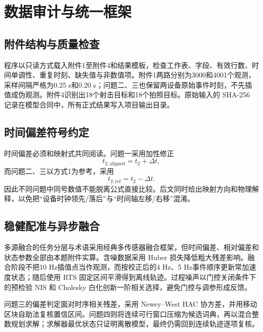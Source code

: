 \section{数据审计与统一框架}

\subsection{附件结构与质量检查}

程序以只读方式载入附件1至附件4和结果模板，检查工作表、字段、有效行数、时间单调性、重复时刻、缺失值与非数值项。附件1两路分别为3000和4001个观测，采样间隔严格为0.25 s和0.20 s；问题二、三也保留两设备原始事件时刻，不先插值成伪观测。附件4识别出18个射击目标和18个拍照目标。原始输入的 SHA-256 记录在模型合同中，所有正式结果写入项目输出目录。

\subsection{时间偏差符号约定}

时间偏差必须和映射式共同阅读。问题一采用加性修正
\begin{equation}
  t_{2,\mathrm{aligned}}=t_2+\Delta t,
  \label{eq:common-q1-time}
\end{equation}
而问题二、三以方式1为参考，采用
\begin{equation}
  t_{2,\mathrm{ref}}=t_2-\Delta t.
  \label{eq:common-q23-time}
\end{equation}
因此不同问题中同号数值不能脱离公式直接比较。后文同时给出映射方向和物理解释，以免把“设备时钟领先/落后”与“时间轴左移/右移”混淆。

\subsection{稳健配准与异步融合}

多源融合的任务分层与术语采用经典多传感器融合框架\cite{hall1997}，但时间偏差、相对偏差和状态参数全部由本题附件实算。含噪数据采用 Huber 损失降低粗大残差影响\cite{huber1964}。融合阶段不把10 Hz插值点当作观测，而按校正后的4 Hz、5 Hz事件顺序更新常加速度状态；随后使用 RTS 固定区间平滑得到离线轨迹\cite{kalman1960,rts1965}。过程噪声以门控关闭条件下的预检验 NIS 和 Cholesky 白化创新一阶相关选择，避免门控与调参形成反馈。

问题三的偏差判定面对时序相关残差，采用 Newey--West HAC 协方差\cite{neweywest1987}，并用移动区块自助法复核置信区间\cite{kunsch1989}。问题四则将连续可行窗口压缩为候选词典，再以混合整数规划求解；求解器最优状态只证明离散模型，最终仍需回到连续轨迹逐项复核。

